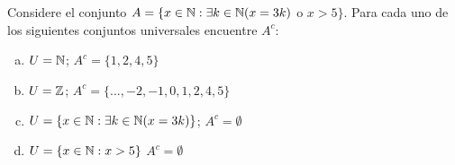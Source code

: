 \section{}
  Considere el conjunto $A = \{x \in \mathbb{N} : \exists k \in \mathbb{N} (x = 3k) $  o  $ x > 5 \}$.
  Para cada uno de los siguientes conjuntos universales encuentre $A^c$: \newline

  \begin{enumerate}[(a)]
    \item $U = \mathbb{N}$; \newline
    $A^c = \{1, 2, 4, 5 \}$

    \item $U = \mathbb{Z}$; \newline
    $A^c = \{ ... , -2, -1, 0, 1, 2, 4, 5 \}$

    \item $U = \{ x \in \mathbb{N} : \exists k \in \mathbb{N} (x = 3k) \}$; \newline
    $A^c = \emptyset$

    \item $U = \{ x \in \mathbb{N} : x > 5 \}$ \newline
    $A^c = \emptyset$
  \end{enumerate}

